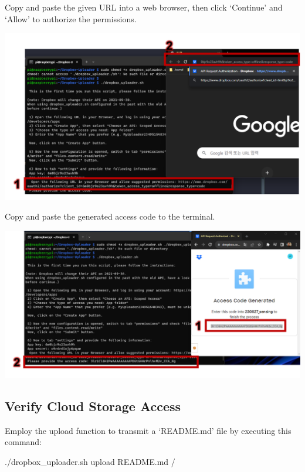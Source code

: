 \documentclass[
  letterpaper,
]{scrbook}
\newenvironment{Shaded}{\begin{snugshade}}{\end{snugshade}}
\newcommand{\ExtensionTok}[1]{\textcolor[rgb]{0.00,0.23,0.31}{#1}}
\newcommand{\NormalTok}[1]{\textcolor[rgb]{0.00,0.23,0.31}{#1}}
\begin{document}
Copy and paste the given URL into a web browser, then click `Continue'
and `Allow' to authorize the permissions.

\includegraphics{content/material/ch2/dropbox_register2.png}

Copy and paste the generated access code to the terminal.

\includegraphics{content/material/ch2/dropbox_register3.png}

\hypertarget{verify-cloud-storage-access}{%
\subsection{Verify Cloud Storage
Access}\label{verify-cloud-storage-access}}

Employ the upload function to transmit a `README.md' file by executing
this command:

\begin{Shaded}
\begin{Highlighting}[]
\ExtensionTok{./dropbox\_uploader.sh}\NormalTok{ upload README.md /}
\end{Highlighting}
\end{Shaded}
\end{document}
